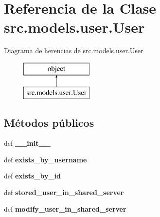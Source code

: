 \hypertarget{classsrc_1_1models_1_1user_1_1_user}{\section{Referencia de la Clase src.\-models.\-user.\-User}
\label{classsrc_1_1models_1_1user_1_1_user}
}
Diagrama de herencias de src.\-models.\-user.\-User\begin{figure}[H]
\begin{center}
\leavevmode
\includegraphics[height=2.000000cm]{classsrc_1_1models_1_1user_1_1_user}
\end{center}
\end{figure}
\subsection*{Métodos públicos}
\begin{DoxyCompactItemize}
\item 
\hypertarget{classsrc_1_1models_1_1user_1_1_user_a700cd275668883b1a33ba8748e2fa9b5}{def {\bfseries \-\_\-\-\_\-init\-\_\-\-\_\-}}\label{classsrc_1_1models_1_1user_1_1_user_a700cd275668883b1a33ba8748e2fa9b5}

\item 
\hypertarget{classsrc_1_1models_1_1user_1_1_user_a0017f93a5236a16c2e8cda903b287cf2}{def {\bfseries exists\-\_\-by\-\_\-username}}\label{classsrc_1_1models_1_1user_1_1_user_a0017f93a5236a16c2e8cda903b287cf2}

\item 
\hypertarget{classsrc_1_1models_1_1user_1_1_user_af6852baecb9f07aad7fa526b92d4fc03}{def {\bfseries exists\-\_\-by\-\_\-id}}\label{classsrc_1_1models_1_1user_1_1_user_af6852baecb9f07aad7fa526b92d4fc03}

\item 
\hypertarget{classsrc_1_1models_1_1user_1_1_user_ab86bb8e7b6e3b095773df938c80e2fbd}{def {\bfseries stored\-\_\-user\-\_\-in\-\_\-shared\-\_\-server}}\label{classsrc_1_1models_1_1user_1_1_user_ab86bb8e7b6e3b095773df938c80e2fbd}

\item 
\hypertarget{classsrc_1_1models_1_1user_1_1_user_a113d7cb1094a9fe8cf3756e6399a1a74}{def {\bfseries modify\-\_\-user\-\_\-in\-\_\-shared\-\_\-server}}\label{classsrc_1_1models_1_1user_1_1_user_a113d7cb1094a9fe8cf3756e6399a1a74}

\end{DoxyCompactItemize}
